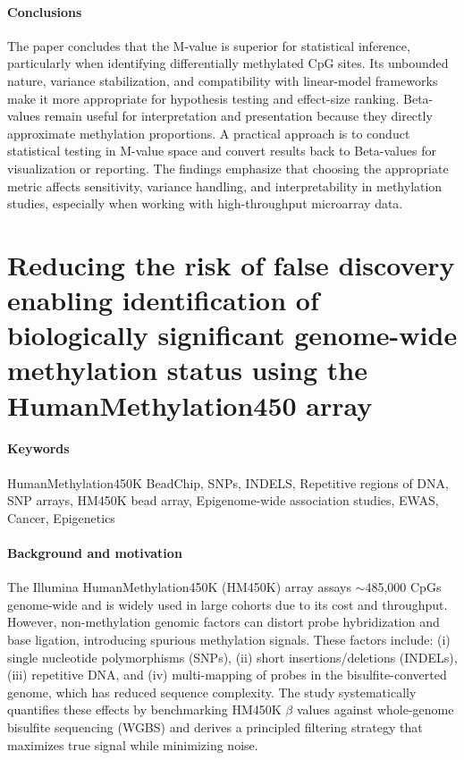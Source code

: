 \documentclass[10pt]{extarticle}
\begin{document}
\paragraph{Conclusions}
The paper concludes that the M-value is superior for statistical inference, particularly when identifying differentially methylated CpG sites. Its unbounded nature, variance stabilization, and compatibility with linear-model frameworks make it more appropriate for hypothesis testing and effect-size ranking. Beta-values remain useful for interpretation and presentation because they directly approximate methylation proportions. A practical approach is to conduct statistical testing in M-value space and convert results back to Beta-values for visualization or reporting. The findings emphasize that choosing the appropriate metric affects sensitivity, variance handling, and interpretability in methylation studies, especially when working with high-throughput microarray data.

\section{Reducing the risk of false discovery enabling identification of biologically significant genome-wide methylation status using the HumanMethylation450 array}

\paragraph{Keywords} HumanMethylation450K BeadChip, SNPs, INDELS, Repetitive regions of DNA, SNP arrays, HM450K bead
array, Epigenome-wide association studies, EWAS, Cancer, Epigenetics \cite{naeem2014}

\paragraph{Background and motivation}
The Illumina HumanMethylation450K (HM450K) array assays \(\sim\)485{,}000 CpGs genome-wide and is widely used in large cohorts due to its cost and throughput. However, non-methylation genomic factors can distort probe hybridization and base ligation, introducing spurious methylation signals. These factors include: (i) single nucleotide polymorphisms (SNPs), (ii) short insertions/deletions (INDELs), (iii) repetitive DNA, and (iv) multi-mapping of probes in the bisulfite-converted genome, which has reduced sequence complexity. The study systematically quantifies these effects by benchmarking HM450K \(\beta\) values against whole-genome bisulfite sequencing (WGBS) and derives a principled filtering strategy that maximizes true signal while minimizing noise. 
\end{document}
